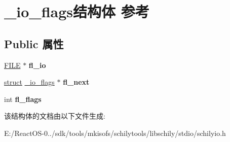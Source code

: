 \hypertarget{struct__io__flags}{}\section{\+\_\+io\+\_\+flags结构体 参考}
\label{struct__io__flags}
\subsection*{Public 属性}
\begin{DoxyCompactItemize}
\item 
\mbox{\label{struct__io__flags_a452c26e182200af87cbf4f9b227d668f}} 
\hyperlink{struct__iobuf}{F\+I\+LE} $\ast$ {\bfseries fl\+\_\+io}
\item 
\mbox{\label{struct__io__flags_ae1fb0d7892e3c87c8cc78a197a0790bf}} 
\hyperlink{interfacestruct}{struct} \hyperlink{struct__io__flags}{\+\_\+io\+\_\+flags} $\ast$ {\bfseries fl\+\_\+next}
\item 
\mbox{\label{struct__io__flags_aa0136edd890e3a0149cd30b8d3838fe9}} 
int {\bfseries fl\+\_\+flags}
\end{DoxyCompactItemize}


该结构体的文档由以下文件生成\+:\begin{DoxyCompactItemize}
\item 
E\+:/\+React\+O\+S-\/0../sdk/tools/mkisofs/schilytools/libschily/stdio/schilyio.\+h\end{DoxyCompactItemize}
